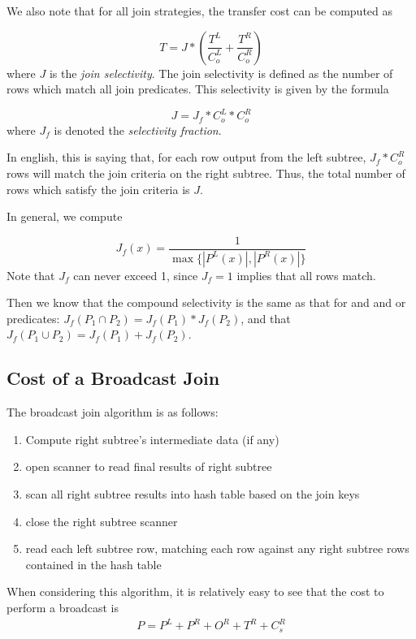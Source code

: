 \documentclass[10pt]{amsart}
\begin{document}
We also note that for all join strategies, the transfer cost can be computed as 

\begin{equation}
	T = J*(\frac{T^L}{C_o^L}+\frac{T^R}{C_o^R})
\end{equation}
where $J$ is the \emph{join selectivity}. The join selectivity is defined as the number of rows which match all join predicates. This selectivity is given by the formula

\begin{equation*}
	J = J_f*C_o^L*C_o^R
\end{equation*}
where $J_f$ is denoted the \emph{selectivity fraction}.

In english, this is saying that, for each row output from the left subtree, $J_f*C_o^R$ rows will match the join criteria on the right subtree. Thus, the total number of rows which satisfy the join criteria is $J$.

In general, we compute

\begin{equation}
				J_f(x) = \frac{1}{\max{\lbrace|P^L(x)|,|P^R(x)|\rbrace}}
\end{equation}
Note that $J_f$ can never exceed 1, since $J_f = 1$ implies that all rows match.

Then we know that the compound selectivity is the same as that for and and or predicates: $J_f(P_1 \cap P_2) = J_f(P_1) * J_f(P_2)$, and that $J_f(P_1 \cup P_2) = J_f(P_1) + J_f(P_2)$. 

\subsection{Cost of a Broadcast Join}
The broadcast join algorithm is as follows:

\begin{enumerate}
				\item Compute right subtree's intermediate data (if any)
				\item open scanner to read final results of right subtree
				\item scan all right subtree results into hash table based on the join keys
				\item close the right subtree scanner
				\item read each left subtree row, matching each row against any right subtree rows contained in the hash table
\end{enumerate}

When considering this algorithm, it is relatively easy to see that the cost to perform a broadcast is 
\begin{equation}
				\begin{aligned}
					P = P^L + P^R+O^R+T^R+C_s^R \\
				\end{aligned}
\end{equation}
\end{document}
